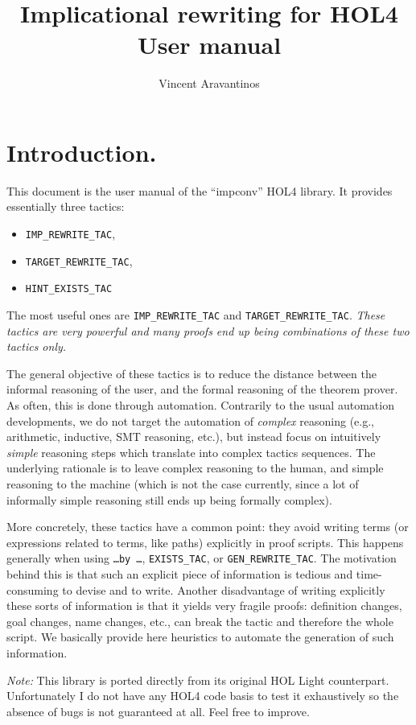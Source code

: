 \documentclass{llncs}
\title{Implicational rewriting for HOL4\\User manual}
\author{Vincent Aravantinos}
\institute{
  \url{vincent.aravantinos@fortiss.org}\\
  Analysis and Design of Dependable Systems, fortiss GmbH, Munich, Germany\footnote{%
formerly: Hardware Verification Group, Concordia University, Montreal, Canada}}
\newcommand*\IMPREWRITETAC{\texttt{IMP\_REWRITE\_TAC}\xspace}
\newcommand*\GENTAC{\texttt{GEN\_REWRITE\_TAC}\xspace}
\newcommand*\SUBGOAL{\texttt{\ldots by \ldots}\xspace}
\newcommand*\TARGETTAC{\texttt{TARGET\_REWRITE\_TAC}\xspace}
\newcommand*\HINTTAC{\texttt{HINT\_EXISTS\_TAC}\xspace}
\newcommand*\EXISTS{\texttt{EXISTS\_TAC}\xspace}
\begin{document}
  \maketitle

  \section{Introduction.}
		This document is the user manual of the ``impconv'' HOL4 library.
    It provides essentially three tactics:
    \begin{itemize}
      \item \IMPREWRITETAC,
      \item \TARGETTAC,
      \item \HINTTAC
    \end{itemize}
    The most useful ones are \IMPREWRITETAC and \TARGETTAC.
    \emph{These tactics are very powerful and many proofs end up being combinations of these two tactics only.}

    The general objective of these tactics is to reduce the distance between the informal reasoning
    of the user, and the formal reasoning of the theorem prover.
    As often, this is done through automation.
    Contrarily to the usual automation developments, we do not target the automation of \emph{complex} reasoning
    (e.g., arithmetic, inductive, SMT reasoning, etc.),
    but instead focus on intuitively \emph{simple} reasoning steps which
    translate into complex tactics sequences.
    The underlying rationale is to leave complex reasoning to the human,
    and simple reasoning to the machine (which is not the case currently, since a lot of informally simple
    reasoning still ends up being formally complex).
   
    More concretely, these tactics have a common point: they avoid writing terms 
    (or expressions related to terms, like paths) explicitly in proof scripts.
    This happens generally when using \SUBGOAL, \EXISTS, or \GENTAC.
    The motivation behind this is that such an explicit piece of information
    is tedious and time-consuming to devise and to write.
    Another disadvantage of writing explicitly these sorts of information is that it yields very fragile proofs:
    definition changes, goal changes, name changes, etc., can break the tactic and therefore the whole script.
    We basically provide here heuristics to automate the generation of such information.

    \emph{Note:} This library is ported directly from its original HOL Light counterpart.
    Unfortunately I do not have any HOL4 code basis to test
    it exhaustively so the absence of bugs is not guaranteed at all.
    Feel free to improve.
\end{document}
